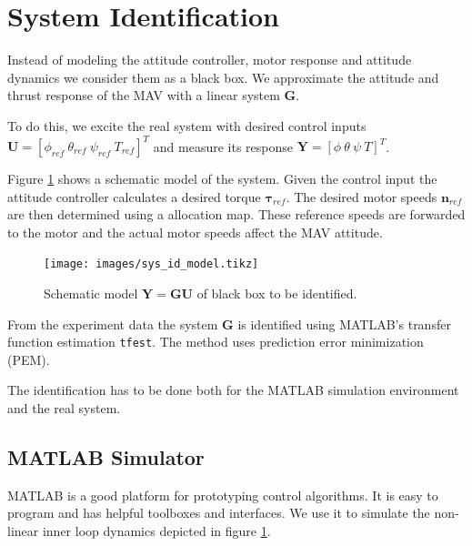 \section{System Identification}
Instead of modeling the attitude controller, motor response and attitude dynamics we consider them as a black box. We approximate the attitude and thrust response of the MAV with a linear system $\mathbf{G}$.

To do this, we excite the real system with desired control inputs $\mathbf{U} = \left[\phi_{ref} ~ \theta_{ref} ~ \psi_{ref} ~ T_{ref} \right]^T$ and measure its response $\mathbf{Y} = \left[\phi ~ \theta ~ \psi ~ T \right]^T$. 

Figure \ref{pics:sys_id_model} shows a schematic model of the system. Given the control input the attitude controller calculates a desired torque $\boldsymbol{\tau}_{ref}$. The desired motor speeds $\mathbf{n}_{ref}$ are then determined using a allocation map. These reference speeds are forwarded to the motor and the actual motor speeds affect the MAV attitude.

\begin{figure}
\centering
\texttt{[image: images/sys\_id\_model.tikz]}
\caption{Schematic model $\mathbf{Y} = \mathbf{G} \mathbf{U}$ of black box to be identified.}
\label{pics:sys_id_model}
\end{figure}

From the experiment data the system $\mathbf{G}$ is identified using MATLAB's transfer function estimation \texttt{tfest}. The method uses prediction error minimization (PEM).

The identification has to be done both for the MATLAB simulation environment and the real system.

\subsection{MATLAB Simulator}
\label{sec:matlab_simulator}
MATLAB is a good platform for prototyping control algorithms. It is easy to program and has helpful toolboxes and interfaces. We use it to simulate the non-linear inner loop dynamics depicted in figure \ref{pics:sys_id_model}.

